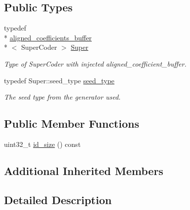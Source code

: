 \subsection*{Public Types}
\begin{DoxyCompactItemize}
\item 
\hypertarget{classkodo_1_1seed__symbol__id_a33ee753629dfd87fb5cb5a7fcd79c363}{typedef \\*
\hyperlink{classkodo_1_1aligned__coefficients__buffer}{aligned\-\_\-coefficients\-\_\-buffer}\\*
$<$ Super\-Coder $>$ \hyperlink{classkodo_1_1seed__symbol__id_a33ee753629dfd87fb5cb5a7fcd79c363}{Super}}\label{classkodo_1_1seed__symbol__id_a33ee753629dfd87fb5cb5a7fcd79c363}

\begin{DoxyCompactList}\small\item\em Type of Super\-Coder with injected aligned\-\_\-coefficient\-\_\-buffer. \end{DoxyCompactList}\item 
\hypertarget{classkodo_1_1seed__symbol__id_a21c36a7ce61c0645924ae9af496d074b}{typedef Super\-::seed\-\_\-type \hyperlink{classkodo_1_1seed__symbol__id_a21c36a7ce61c0645924ae9af496d074b}{seed\-\_\-type}}\label{classkodo_1_1seed__symbol__id_a21c36a7ce61c0645924ae9af496d074b}

\begin{DoxyCompactList}\small\item\em The seed type from the generator used. \end{DoxyCompactList}\end{DoxyCompactItemize}
\subsection*{Public Member Functions}
\begin{DoxyCompactItemize}
\item 
uint32\-\_\-t \hyperlink{classkodo_1_1seed__symbol__id_afd783700bd110101096d3c61a05c53f9}{id\-\_\-size} () const 
\begin{DoxyCompactList}\small\item\em \end{DoxyCompactList}\end{DoxyCompactItemize}
\subsection*{Additional Inherited Members}


\subsection{Detailed Description}
